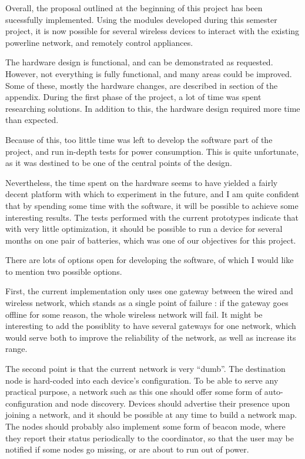 Overall, the proposal outlined at the beginning of this project has been
sucessfully implemented. Using the modules developed during this semester
project, it is now possible for several wireless devices to interact with the
existing powerline network, and remotely control appliances.

The hardware design is functional, and can be demonstrated as requested.
However, not everything is fully functional, and many areas could be improved.
Some of these, mostly the hardware changes, are described in section
 of the appendix. During the first phase of the
project, a lot of time was spent researching solutions. In addition to this, the
hardware design required more time than expected.

Because of this, too little time was left to develop the software part of the
project, and run in-depth tests for power consumption. This is quite
unfortunate, as it was destined to be one of the central points of the design.

Nevertheless, the time spent on the hardware seems to have yielded a fairly
decent platform with which to experiment in the future, and I am quite confident
that by spending some time with the software, it will be possible to achieve
some interesting results. The tests performed with the current prototypes
indicate that with very little optimization, it should be possible to run a
device for several months on one pair of batteries, which was one of our
objectives for this project.

There are lots of options open for developing the software, of which I would
like to mention two possible options.

First, the current implementation only uses one gateway between the wired and
wireless network, which stands as a single point of failure : if the gateway
goes offline for some reason, the whole wireless network will fail. It might be
interesting to add the possiblity to have several gateways for one network,
which would serve both to improve the reliability of the network, as well as
increase its range.

The second point is that the current network is very ``dumb''. The destination
node is hard-coded into each device's configuration. To be able to serve any
practical purpose, a network such as this one should offer some form of
auto-configuration and node discovery. Devices should advertise their presence
upon joining a network, and it should be possible at any time to build a network
map. The nodes should probably also implement some form of beacon mode, where
they report their status periodically to the coordinator, so that the user may
be notified if some nodes go missing, or are about to run out of power.

